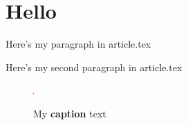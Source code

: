 \documentclass{article}
\begin{document}
\section{Hello}

Here's my paragraph in article.tex



Here's my second paragraph in article.tex

\begin{figure}
  \includegraphics[alt={My \textbf{alt} text}]{image.png}
  \caption{My \textbf{caption} text}
\end{figure}
\end{document}
